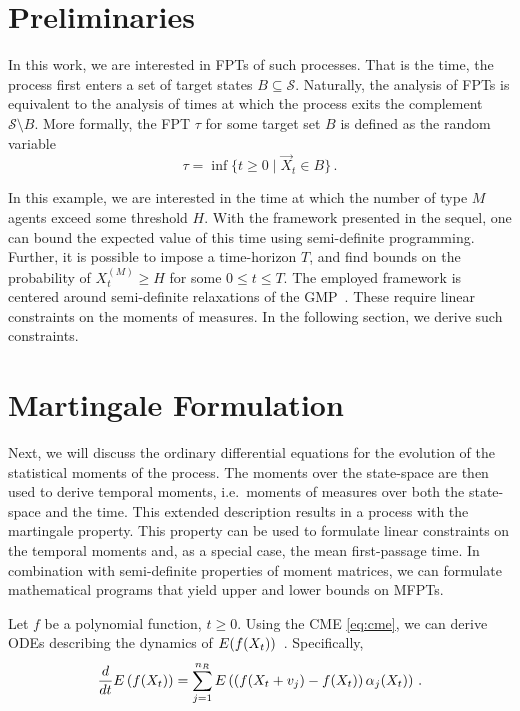 \section{Preliminaries}\label{sec:mfpt:bg}



In this work, we are interested in \acfp{FPT} of such processes.
That is the time, the process first enters a set of target states
$B\subseteq \mathcal{S}$. Naturally, the analysis of \acp{FPT} is
equivalent
to the analysis of times at which the process exits the complement $\mathcal{S}\setminus B$.
More formally, the \acl{FPT} $\tau$ for
some target set $B$ is defined as the random variable
\begin{equation}\label{eq:fpt_def}
    \tau = \inf\{t\geq 0\mid \vec X_t \in B\}\,.
\end{equation}


In this example, we are interested in the time at which the number of type $M$ agents
exceed some threshold $H$.
With the framework presented in the sequel, one can bound the expected value
of this time using semi-definite programming.
Further, it is possible to impose a time-horizon $T$, and find bounds
on the probability of $ X_t^{(M)}\geq H$ for some $0\leq t\leq T$.
The employed framework is centered around semi-definite relaxations
of the \ac{GMP}~\parencite{lasserre2010moments}.
These require linear constraints on the moments of measures.
In the following section, we derive such constraints.

\section{Martingale Formulation}\label{sec:mfpt:moments}
Next, we will discuss the ordinary differential equations for the evolution of the statistical moments of
the process.
The moments over the state-space are then used to derive temporal moments, i.e.\ moments
of measures over both the state-space and the time.
This extended description results in a process with the martingale property.
This property can be used to formulate linear constraints on the temporal moments
and, as a special case, the mean first-passage time.
In combination with semi-definite properties of moment matrices, we can formulate
mathematical programs that yield upper and lower bounds on \aclp{MFPT}\@.


Let $f$ be a polynomial function, $t\ge0$.
Using the \ac{CME} \eqref{eq:cme}, we can derive \acp{ODE}
describing the dynamics of ${E}(f(X_t))$~\parencite{engblom2006computing}.
Specifically,
\begin{equation}\label{eq:mfpt:mom_ode}
    \frac{d}{dt}{E}\left(f(X_t)\right) = \sum_{j=1}^{n_R}{E}\left(\left(f({X_t +
    v_j}) - f(X_t)\right)\alpha_j(X_t)\right)\,.
\end{equation}

